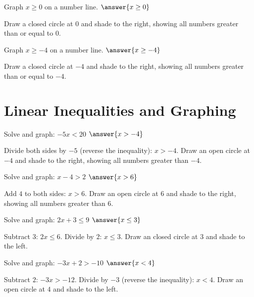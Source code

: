 \documentclass{ximera}
\begin{document}
\begin{problem}
Graph $x \geq 0$ on a number line. $\answer{x \geq 0}$
\begin{feedback}
Draw a closed circle at $0$ and shade to the right, showing all numbers greater than or equal to $0$.
\end{feedback}
\end{problem}

\begin{problem}
Graph $x \geq -4$ on a number line. $\answer{x \geq -4}$
\begin{feedback}
Draw a closed circle at $-4$ and shade to the right, showing all numbers greater than or equal to $-4$.
\end{feedback}
\end{problem}


\section*{Linear Inequalities and Graphing}


\begin{problem}
Solve and graph: $-5x < 20$ $\answer{x > -4}$
\begin{feedback}
Divide both sides by $-5$ (reverse the inequality): $x > -4$. Draw an open circle at $-4$ and shade to the right, showing all numbers greater than $-4$.
\end{feedback}
\end{problem}

\begin{problem}
Solve and graph: $x - 4 > 2$ $\answer{x > 6}$
\begin{feedback}
Add $4$ to both sides: $x > 6$. Draw an open circle at $6$ and shade to the right, showing all numbers greater than $6$.
\end{feedback}
\end{problem}

\begin{problem}
Solve and graph: $2x + 3 \leq 9$ $\answer{x \leq 3}$
\begin{feedback}
Subtract $3$: $2x \leq 6$. Divide by $2$: $x \leq 3$. Draw an closed circle at $3$ and shade to the left.
\end{feedback}
\end{problem}

\begin{problem}
Solve and graph: $-3x + 2 > -10$ $\answer{x < 4}$
\begin{feedback}
Subtract $2$: $-3x > -12$. Divide by $-3$ (reverse the inequality): $x < 4$. Draw an open circle at $4$ and shade to the left.
\end{feedback}
\end{problem}
\end{document}
